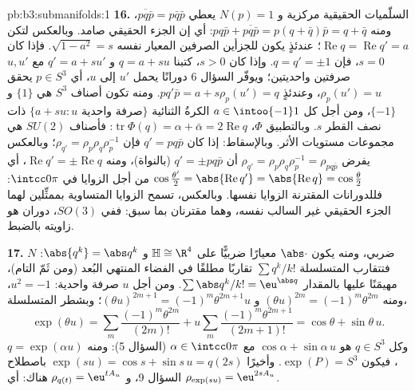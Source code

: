 \begin{solution}{pb:b3:submanifolds:1}
\textbf{16.} السلّميات الحقيقية مركزية و $N(p) = 1$ يعطي
$\overline{pq\bar p} = p\bar q\bar p$، ومنه $pq\bar p +
\overline{pq\bar p} = p(q + \bar q)\bar p = q + \bar q$: أي إن الجزء الحقيقي صامد. وبالعكس لتكن
$\operatorname{Re}q = \operatorname{Re}q' = a$؛ عندئذٍ يكون للجزأين الصرفين المعيار نفسه $\sqrt{1 - a^2} = s$. فإذا
كان $s =
0$، فإن $q = q' = \pm1$. وإذا كان $s > 0$، كتبنا
$q = a + su$ و $q' =
a + su'$ مع $u, u'$ صرفتين واحديتين؛ ويوفّر
السؤال 6 دورانًا يحمل $u'$ إلى $u$، أي $p \in S^3$ يحقق
$\rho_p(u') = u$، وعندئذٍ $pq'\bar p = a + s\rho_p(u') =
q$. ومنه تكون أصناف $S^3$ هي
$\{1\}$ و $\{-1\}$، ومن أجل كل $a \in \intoo{-1}1$ الكرةُ الثنائية $\{a + su :
u \text{ صرفة واحدية}\}$
ذات نصف القطر $s$. وبالتطبيق $\Phi$، $\operatorname{tr}\Phi(q) = \alpha + \bar\alpha =
2\operatorname{Re}q$: فأصناف $SU(2)$
هي مجموعات مستويات الأثر. وبالإسقاط: إذا كان $q' = pq\bar p$
فإن $\rho_{q'} = \rho_p\rho_q\rho_p^{-1}$؛ وبالعكس يفرض $\rho_{q'} = \rho_p\rho_q\rho_p^{-1} = \rho_{pq\bar p}$ أن $q' = \pm pq\bar p$ (بالنواة)، ومنه
$\operatorname{Re}q' = \pm\operatorname{Re}q$، أي $\cos\frac{\theta'}2 = \abs{\operatorname{Re}q'} =
\abs{\operatorname{Re}q} = \cos\frac\theta2$ من أجل الزوايا في $\intcc0\pi$: فللدورانات
المقترنة الزوايا نفسها. وبالعكس، تسمح الزوايا المتساوية
بممثِّلين لهما الجزء الحقيقي غير السالب نفسه، وهما مقترنان بما
سبق: ففي $SO(3)$،  دوران هو زاويته بالضبط.

\textbf{17.} $N$ ضربي، ومنه يكون $\abs\cdot$ معيارًا ضربيًّا على
$\mathbb H \cong \R^4$ و $\abs{q^k} = \abs q^k$: فتتقارب المتسلسلة $\sum q^k/k!$ تقاربًا
مطلقًا في الفضاء المنتهي البُعد (ومن ثَمّ التام)، مهيمَنًا
عليها بالمقدار $\sum\abs q^k/k! = \eu^{\abs q}$. ومن أجل $u$ صرفة واحدية: $u^2 = -1$،
ومنه $(\theta u)^{2m} =
(-1)^m\theta^{2m}$ و $(\theta u)^{2m+1} =
(-1)^m\theta^{2m+1}u$؛ وبشطر المتسلسلة،
\[
\exp(\theta u) = \sum_m\frac{(-1)^m\theta^{2m}}{(2m)!} +
u\sum_m\frac{(-1)^m\theta^{2m+1}}{(2m+1)!} = \cos\theta +
\sin\theta\,u .
\]
وكل $q \in S^3$ هو $\cos\alpha + \sin\alpha\,u$ مع $\alpha \in \intcc0\pi$ (السؤال 5): ومنه $q = \exp(\alpha u)$،
فيكون $\exp(P) = S^3$. وأخيرًا $\exp(su) = \cos s + \sin s\,u
= q(2s)$ باصطلاح السؤال 9،
و $\rho_{q(t)} =
\eu^{tA_u}$ هناك: أي $\rho_{\exp(su)} = \eu^{2sA_u}$.


\end{solution}
